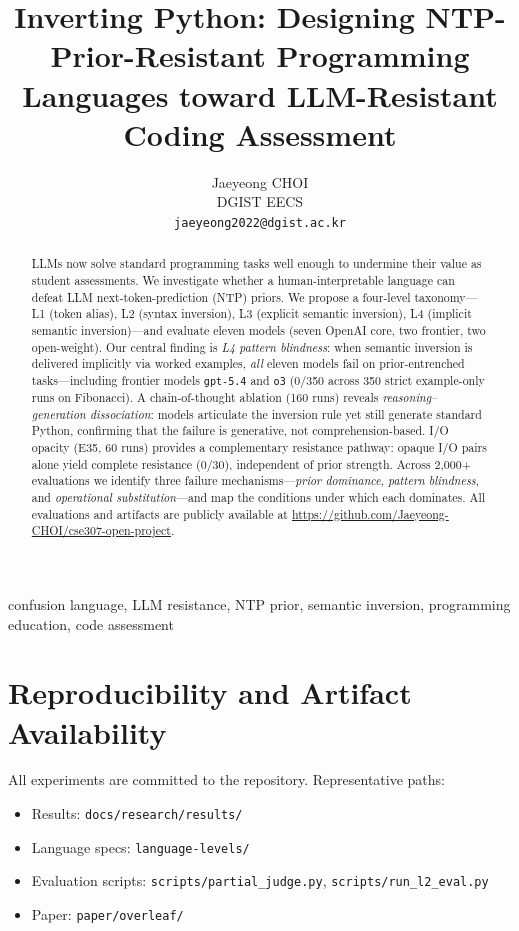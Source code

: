 \documentclass[conference,10pt]{IEEEtran}
\title{Inverting Python: Designing NTP-Prior-Resistant Programming Languages toward LLM-Resistant Coding Assessment}
\author{Jaeyeong CHOI\\
DGIST EECS\\
\texttt{jaeyeong2022@dgist.ac.kr}}
\begin{document}
\maketitle

\begin{abstract}
LLMs now solve standard programming tasks well enough to undermine their value as student assessments.
We investigate whether a human-interpretable language can defeat LLM next-token-prediction (NTP) priors.
We propose a four-level taxonomy---L1 (token alias), L2 (syntax inversion), L3 (explicit semantic inversion), L4 (implicit semantic inversion)---and evaluate eleven models (seven OpenAI core, two frontier, two open-weight).
Our central finding is \emph{L4 pattern blindness}: when semantic inversion is delivered implicitly via worked examples, \emph{all} eleven models fail on prior-entrenched tasks---including frontier models \texttt{gpt-5.4} and \texttt{o3} (0/350 across 350 strict example-only runs on Fibonacci).
A chain-of-thought ablation (160 runs) reveals \emph{reasoning--generation dissociation}: models articulate the inversion rule yet still generate standard Python, confirming that the failure is generative, not comprehension-based.
I/O opacity (E35, 60 runs) provides a complementary resistance pathway: opaque I/O pairs alone yield complete resistance (0/30), independent of prior strength.
Across 2,000+ evaluations we identify three failure mechanisms---\emph{prior dominance}, \emph{pattern blindness}, and \emph{operational substitution}---and map the conditions under which each dominates.
All evaluations and artifacts are publicly available at \url{https://github.com/Jaeyeong-CHOI/cse307-open-project}.
\end{abstract}

\begin{IEEEkeywords}
confusion language, LLM resistance, NTP prior, semantic inversion, programming education, code assessment
\end{IEEEkeywords}












\section{Reproducibility and Artifact Availability}
All experiments are committed to the repository. Representative paths:
\begin{itemize}
  \item Results: \texttt{docs/research/results/}
  \item Language specs: \texttt{language-levels/}
  \item Evaluation scripts: \texttt{scripts/partial\_judge.py}, \texttt{scripts/run\_l2\_eval.py}
  \item Paper: \texttt{paper/overleaf/}
\end{itemize}



\end{document}
